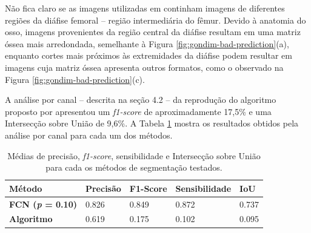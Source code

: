 Não fica claro se as imagens utilizadas em \cite{gondim2021automatic} continham imagens de diferentes regiões da diáfise femoral -- região intermediária do fêmur. Devido à anatomia do osso, imagens provenientes da região central da diáfise resultam em uma matriz óssea mais arredondada, semelhante à Figura \ref{fig:gondim-bad-prediction}(a), enquanto cortes mais próximos às extremidades da diáfise podem resultar em imagens cuja matriz óssea apresenta outros formatos, como o observado na Figura \ref{fig:gondim-bad-prediction}(c). 

A análise por canal -- descrita na seção 4.2 -- da reprodução do algoritmo proposto por \cite{gondim2021automatic} apresentou um \textit{f1-score} de aproximadamente 17,5\% e uma Intersecção sobre União de 9,6\%. A Tabela \ref{tab:metricas-comparacao-por-canal} mostra os resultados obtidos pela análise por canal para cada um dos métodos.


\begin{table}[h]
\center
\begin{tiny}
\begin{tabular}{|l|l|l|l|l|}
\hline
\rowcolor[HTML]{C0C0C0} 
\textbf{Método} & \textbf{Precisão} & \textbf{F1-Score} & \textbf{Sensibilidade}   & \textbf{IoU}     \\ 
\hline
\cellcolor[HTML]{EFEFEF}\textbf{FCN (\textit{p} = 0.10)} & 0.826 & 0.849 & 0.872 & 0.737 \\
\hline
\cellcolor[HTML]{EFEFEF}\textbf{Algoritmo \cite{gondim2021automatic}} & 0.619 & 0.175 & 0.102 & 0.095 \\
\hline
\end{tabular}
\end{tiny}
\caption{Médias de precisão, \textit{f1-score}, sensibilidade e Intersecção sobre União para cada os métodos de segmentação testados.}
    \label{tab:metricas-comparacao-por-canal}
\end{table}